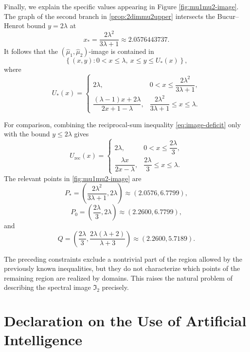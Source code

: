 \documentclass{amsart}
\numberwithin{equation}{section}
\theoremstyle{plain}
\theoremstyle{definition}
\theoremstyle{plain}
\theoremstyle{remark}
\numberwithin{figure}{section}
\newcommand{\muu}{\widehat{\mu}}
\begin{document}
Finally, we explain the specific values  appearing in Figure \ref{fig:mu1mu2-image}. 
The graph of the second branch in  \cref{prop:2dimmu2upper} intersects the Bucur--Henrot bound $y=2\lambda$ at
\[
    x_*=\frac{2\lambda^2}{3\lambda+1} \approx2.0576443737.
\]
It follows that the $(\muu_1,\muu_2)$-image is contained in
\begin{equation}
    \label{eq:image-refined-region}
    \left\{ (x,y): 0<x\leq\lambda,~x\leq y\leq U_*(x) \right\},
\end{equation}
where
\begin{equation}
    \label{eq:image-improved-upper-bound}
    U_*(x)=
    \begin{cases}
        2\lambda, & 0<x\leq \dfrac{2\lambda^2}{3\lambda+1},\\[3mm]
        \dfrac{(\lambda-1)x+2\lambda} {2x+1-\lambda}, & \dfrac{2\lambda^2}{3\lambda+1} \leq x\leq\lambda.
    \end{cases}
\end{equation}

For comparison, combining the reciprocal-sum inequality \cref{eq:image-deficit} only with the bound $y\leq2\lambda$ gives
\begin{equation*}
    U_{\mathrm{rec}}(x)=
    \begin{cases}
        2\lambda, & 0<x\leq\dfrac{2\lambda}{3},\\[3mm]
        \dfrac{\lambda x}{2x-\lambda}, & \dfrac{2\lambda}{3}\leq x\leq\lambda.
    \end{cases}
\end{equation*}
The relevant points in \cref{fig:mu1mu2-image} are
\[
    P_*= \left( \frac{2\lambda^2}{3\lambda+1},2\lambda \right) \approx(2.0576,6.7799),
\]
\[
    P_0= \left( \frac{2\lambda}{3},2\lambda \right) \approx(2.2600,6.7799),
\]
and
\[
    Q= \left( \frac{2\lambda}{3}, \frac{2\lambda(\lambda+2)}{\lambda+3} \right) \approx(2.2600,5.7189).
\]
 
The preceding constraints exclude a nontrivial part of the region allowed by the previously known inequalities, but they do not characterize which points of the remaining region are realized by domains. This raises the natural problem of describing the spectral image $\mathfrak{I}_2$ precisely.



 \section*{Declaration on the Use of Artificial Intelligence}
 
\end{document}
